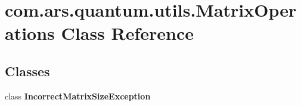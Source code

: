 \hypertarget{classcom_1_1ars_1_1quantum_1_1utils_1_1_matrix_operations}{}\section{com.\+ars.\+quantum.\+utils.\+Matrix\+Operations Class Reference}
\label{classcom_1_1ars_1_1quantum_1_1utils_1_1_matrix_operations}
\subsection*{Classes}
\begin{DoxyCompactItemize}
\item 
class {\bfseries Incorrect\+Matrix\+Size\+Exception}
\end{DoxyCompactItemize}
